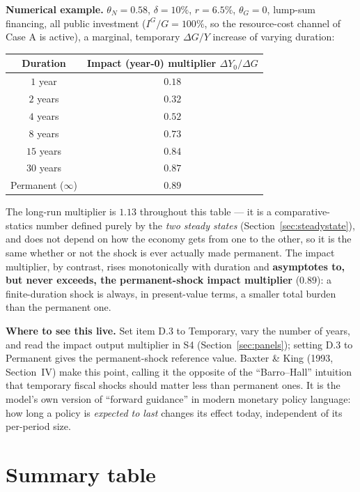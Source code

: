 \documentclass[11pt]{article}
\begin{document}
\begin{casebox}
\textbf{Numerical example.} $\theta_N=0.58$, $\delta=10\%$, $r=6.5\%$,
$\theta_G=0$, lump-sum financing, all public investment ($I^G/G=100\%$,
so the resource-cost channel of Case A is active), a marginal, temporary
$\Delta G/Y$ increase of varying duration:
\begin{center}
\begin{tabular}{cc}
\toprule
Duration & Impact (year-0) multiplier $\Delta Y_0/\Delta G$ \\
\midrule
$1$ year & $0.18$ \\
$2$ years & $0.32$ \\
$4$ years & $0.52$ \\
$8$ years & $0.73$ \\
$15$ years & $0.84$ \\
$30$ years & $0.87$ \\
Permanent ($\infty$) & $0.89$ \\
\bottomrule
\end{tabular}
\end{center}
The long-run multiplier is $1.13$ throughout this table --- it is a
comparative-statics number defined purely by the \emph{two steady
states} (Section~\ref{sec:steadystate}), and does not depend on how the
economy gets from one to the other, so it is the same whether or not the
shock is ever actually made permanent. The impact multiplier, by
contrast, rises monotonically with duration and \textbf{asymptotes to,
but never exceeds, the permanent-shock impact multiplier} ($0.89$): a
finite-duration shock is always, in present-value terms, a smaller
total burden than the permanent one.
\end{casebox}

\begin{notebox}
\textbf{Where to see this live.} Set item D.3 to Temporary, vary the
number of years, and read the impact output multiplier in S4
(Section~\ref{sec:panels}); setting D.3 to Permanent gives the
permanent-shock reference value. Baxter \& King (1993, Section~IV) make this
point, calling it the opposite of the ``Barro--Hall'' intuition that
temporary fiscal shocks should matter less than permanent ones. It is
the model's own version of ``forward guidance'' in modern monetary
policy language: how long a policy is \emph{expected to last} changes
its effect today, independent of its per-period size.
\end{notebox}

\section{Summary table}
\end{document}
